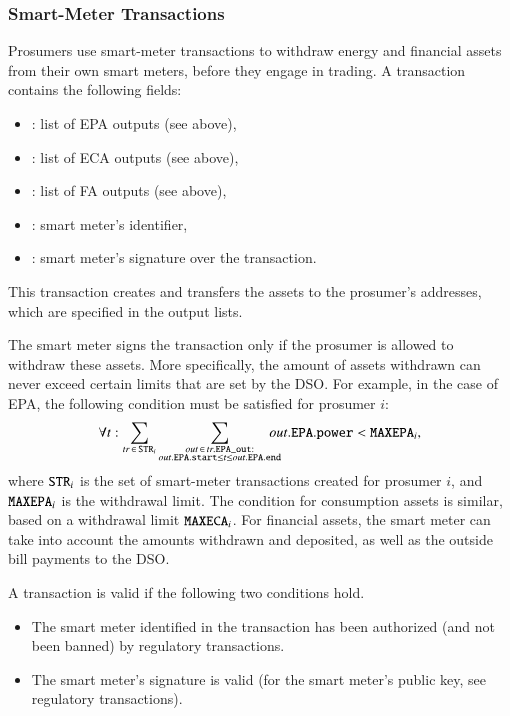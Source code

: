 \subsubsection{Smart-Meter Transactions}

Prosumers use smart-meter transactions to withdraw energy and
financial assets from their own smart meters, before they engage in
trading.
%
A transaction contains the following fields:
\begin{itemize}[noitemsep,topsep=-\parskip]
\item {}: list of EPA outputs (see above),
\item {}: list of ECA outputs (see above),
\item {}: list of FA outputs (see above),
\item {}: smart meter's identifier,
\item {}: smart meter's signature over the transaction.
\end{itemize}
\vspace{0.5\parskip} This transaction creates and transfers the assets
to the prosumer's addresses, which are specified in the output lists.

The smart meter signs the transaction only if the prosumer is allowed
to withdraw these assets.  More specifically, the amount of assets
withdrawn can never exceed certain limits that are set by the DSO.
For example, in the case of EPA, the following condition must be
satisfied for prosumer $i$:
\begin{equation*}
\forall t: \sum_{tr \,\in\, \texttt{STR}_i} \sum_{\substack{out \,\in\, tr.\texttt{EPA\_out}:\\out.\texttt{EPA}.\texttt{start} \leq t \leq out.\texttt{EPA}.\texttt{end}}} \hspace{-1em} out.\texttt{EPA}.\texttt{power} < \texttt{MAXEPA}_i ,
\end{equation*}
where $\texttt{STR}_i$ is the set of smart-meter transactions created
for prosumer $i$, and $\texttt{MAXEPA}_i$ is the withdrawal limit.  The
condition for consumption assets is similar, based on a withdrawal
limit $\texttt{MAXECA}_i$.  For financial assets, the smart meter can
take into account the amounts withdrawn and deposited, as well as the
outside bill payments to the DSO.

A transaction is valid if the following two conditions hold.
\begin{itemize}[noitemsep,topsep=-\parskip]
\item The smart meter identified in the transaction has been authorized (and not been banned) by regulatory transactions. %
\item The smart meter's signature is valid (for the smart meter's public key, see regulatory transactions).
\end{itemize}

